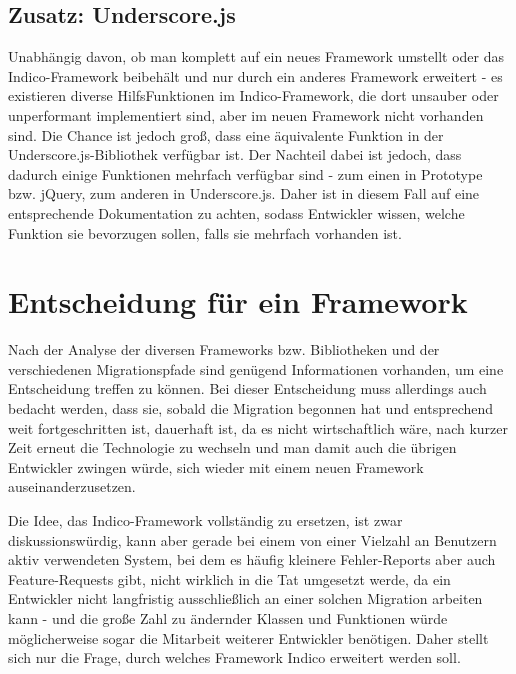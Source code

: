 \subsection{Zusatz: Underscore.js}
Unabhängig davon, ob man komplett auf ein neues Framework umstellt oder das Indico-Framework
beibehält und nur durch ein anderes Framework erweitert - es existieren diverse HilfsFunktionen im
Indico-Framework, die dort unsauber oder unperformant implementiert sind, aber im neuen Framework
nicht vorhanden sind. Die Chance ist jedoch groß, dass eine äquivalente Funktion in der
Underscore.js-Bibliothek verfügbar ist. Der Nachteil dabei ist jedoch, dass dadurch einige Funktionen
mehrfach verfügbar sind - zum einen in Prototype bzw. jQuery, zum anderen in Underscore.js. Daher
ist in diesem Fall auf eine entsprechende Dokumentation zu achten, sodass Entwickler wissen, welche
Funktion sie bevorzugen sollen, falls sie mehrfach vorhanden ist.


\section{Entscheidung für ein Framework}

Nach der Analyse der diversen Frameworks bzw. Bibliotheken und der verschiedenen Migrationspfade
sind genügend Informationen vorhanden, um eine Entscheidung treffen zu können. Bei dieser
Entscheidung muss allerdings auch bedacht werden, dass sie, sobald die Migration begonnen hat und
entsprechend weit fortgeschritten ist, dauerhaft ist, da es nicht wirtschaftlich wäre, nach kurzer
Zeit erneut die Technologie zu wechseln und man damit auch die übrigen Entwickler zwingen würde,
sich wieder mit einem neuen Framework auseinanderzusetzen.

Die Idee, das Indico-Framework vollständig zu ersetzen, ist zwar diskussionswürdig, kann aber gerade
bei einem von einer Vielzahl an Benutzern aktiv verwendeten System, bei dem es häufig kleinere
Fehler-Reports aber auch Feature-Requests gibt, nicht wirklich in die Tat umgesetzt werde, da ein
Entwickler nicht langfristig ausschließlich an einer solchen Migration arbeiten kann - und die große
Zahl zu ändernder Klassen und Funktionen würde möglicherweise sogar die Mitarbeit weiterer
Entwickler benötigen. Daher stellt sich nur die Frage, durch welches Framework Indico erweitert
werden soll.

